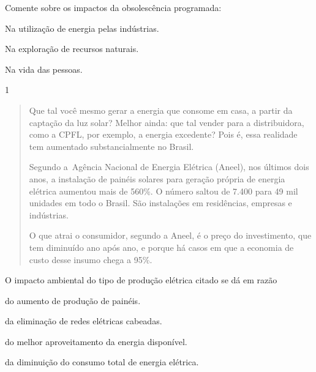 Comente sobre os impactos da obsolescência programada:

\begin{escolha}
\item  Na utilização de energia pelas indústrias.


\item  Na exploração de recursos naturais.


\item Na vida das pessoas.

\end{escolha}


\num{1}

\begin{quote}
Que tal você mesmo gerar a energia que consome em casa, a
partir da captação da luz solar? Melhor ainda: que tal vender para a
distribuidora, como a CPFL, por exemplo, a energia excedente? Pois é,
essa realidade tem aumentado substancialmente no Brasil.

Segundo a~Agência Nacional de Energia Elétrica (Aneel), nos
últimos dois anos, a instalação de painéis solares para geração própria
de energia elétrica aumentou mais de 560\%. O número saltou de 7.400
para 49 mil unidades em todo o Brasil. São instalações em residências,
empresas e indústrias.

O que atrai o consumidor, segundo a Aneel, é o preço do
investimento, que tem diminuído ano após ano, e porque há casos em que a
economia de custo desse insumo chega a 95\%.

\end{quote}

O impacto ambiental do tipo de produção elétrica citado se dá em razão

\begin{escolha}
\item
  do aumento de produção de painéis.
\item
  da eliminação de redes elétricas cabeadas.
\item
  do melhor aproveitamento da energia disponível.
\item
  da diminuição do consumo total de energia elétrica.
\end{escolha}

